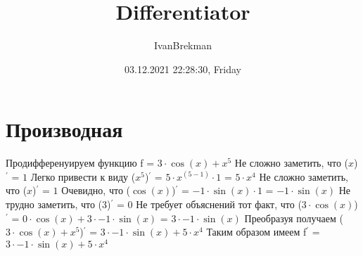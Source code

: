 \documentclass{article}
\title{Differentiator}
\author{IvanBrekman}
\date{03.12.2021 22:28:30, Friday}
\begin{document}
\maketitle

\section {Производная}
Продифференуируем функцию f = $ 3 \cdot \cos{(x)} + {x}^{5} $\newline
Не сложно заметить, что \newline
($ x $)$ ^\prime $ = $ 1 $\newline
\newline
Легко привести к виду \newline
($ {x}^{5} $)$ ^\prime $ = $ 5 \cdot {x}^{(5 - 1)} \cdot 1 $ = $ 5 \cdot {x}^{4} $\newline
\newline
Не сложно заметить, что \newline
($ x $)$ ^\prime $ = $ 1 $\newline
\newline
Очевидно, что \newline
($ \cos{(x)} $)$ ^\prime $ = $ -1 \cdot \sin{(x)} \cdot 1 $ = $ -1 \cdot \sin{(x)} $\newline
\newline
Не трудно заметить, что \newline
($ 3 $)$ ^\prime $ = $ 0 $\newline
\newline
Не требует объяснений тот факт, что \newline
($ 3 \cdot \cos{(x)} $)$ ^\prime $ = $ 0 \cdot \cos{(x)} + 3 \cdot -1 \cdot \sin{(x)} $ = $ 3 \cdot -1 \cdot \sin{(x)} $\newline
\newline
Преобразуя получаем \newline
($ 3 \cdot \cos{(x)} + {x}^{5} $)$ ^\prime $ = $ 3 \cdot -1 \cdot \sin{(x)} + 5 \cdot {x}^{4} $\newline
\newline
Таким образом имеем f$^\prime$ = $ 3 \cdot -1 \cdot \sin{(x)} + 5 \cdot {x}^{4} $
\end{document}
